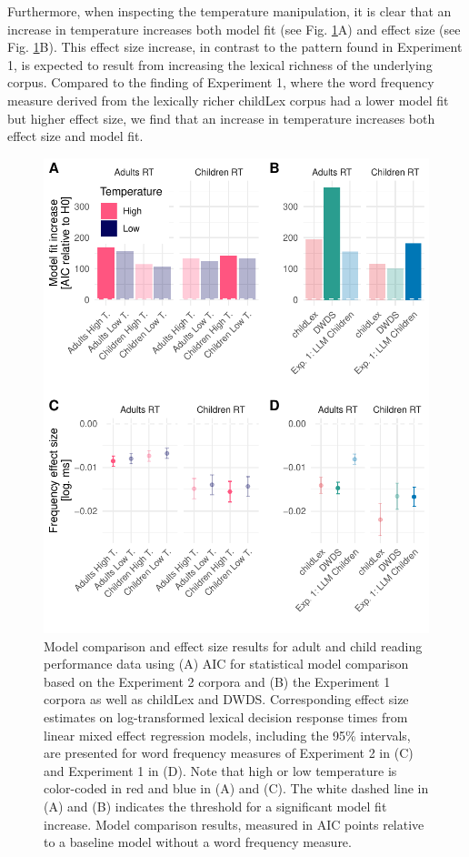 \documentclass[doc, a4paper]{apa7}
\begin{document}
Furthermore, when inspecting the temperature manipulation, it is clear that an increase in temperature increases both model fit (see Fig. \ref{fig:modelcomprt2}A) and effect size (see Fig. \ref{fig:modelcomprt2}B). This effect size increase, in contrast to the pattern found in Experiment 1, is expected to result from increasing the lexical richness of the underlying corpus. Compared to the finding of Experiment 1, where the word frequency measure derived from the lexically richer childLex corpus had a lower model fit but higher effect size, we find that an increase in temperature increases both effect size and model fit. 

\begin{figure}[!htbp]
  \centerline{
    \includegraphics[width=.8\textwidth]{figures/exp12-new-col.pdf}}
    \caption{Model comparison and effect size results for adult and child reading performance data using (A) AIC for statistical model comparison based on the Experiment 2 corpora and (B) the Experiment 1 corpora as well as childLex and DWDS. Corresponding effect size estimates on log-transformed lexical decision response times from linear mixed effect regression models, including the 95\% intervals, are presented for word frequency measures of Experiment 2 in (C) and Experiment 1 in (D). Note that high or low temperature is color-coded in red and blue in (A) and (C). The white dashed line in (A) and (B) indicates the threshold for a significant model fit increase. Model comparison results, measured in AIC points relative to a baseline model without a word frequency measure.}
    \label{fig:modelcomprt2}
\end{figure}
\end{document}
